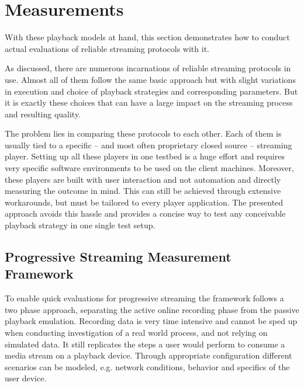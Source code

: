 \section{Measurements}
\label{c3:measurements}

With these playback models at hand, this section demonstrates how to conduct actual evaluations of reliable streaming protocols with it.

As discussed, there are numerous incarnations of reliable streaming protocols in use. Almost all of them follow the same basic approach but with slight variations in execution and choice of playback strategies and corresponding parameters. But it is exactly these choices that can have a large impact on the streaming process and resulting quality. 

The problem lies in comparing these protocols to each other. Each of them is usually tied to a specific -- and most often proprietary closed source -- streaming player. Setting up all these players in one testbed is a huge effort and requires very specific software environments to be used on the client machines. Moreover, these players are built with user interaction and not automation and directly measuring the outcome in mind. This can still be achieved through extensive workarounds, but must be tailored to every player application. The presented approach avoids this hassle and provides a concise way to test any conceivable playback strategy in one single test setup.


\subsection{Progressive Streaming Measurement Framework}

To enable quick evaluations for progressive streaming the framework follows a two phase approach, separating the active online recording phase from the passive playback emulation. Recording data is very time intensive and cannot be sped up when conducting investigation of a real world process, and not relying on simulated data. It still replicates the steps a user would perform to consume a media stream on a playback device. Through appropriate configuration different scenarios can be modeled, e.g. network conditions, behavior and specifics of the user device.
 
